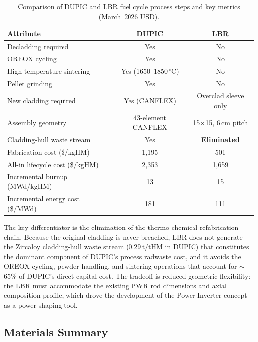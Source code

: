 \begin{table}[H]
\centering
\caption{Comparison of DUPIC and LBR fuel cycle process steps and key
metrics (March~2026 USD).}
\label{tab:dupic_lbr}
\renewcommand{\arraystretch}{1.30}
\begin{tabular}{l c c}
\toprule
\textbf{Attribute} & \textbf{DUPIC} & \textbf{LBR} \\
\midrule
Decladding required             & Yes               & No \\
OREOX cycling                   & Yes               & No \\
High-temperature sintering      & Yes (1650--1850\,$^\circ$C) & No \\
Pellet grinding                 & Yes               & No \\
New cladding required           & Yes (CANFLEX)     & Overclad sleeve only \\
Assembly geometry               & 43-element CANFLEX & 15$\times$15, 6\,cm pitch \\
Cladding-hull waste stream      & Yes               & \textbf{Eliminated} \\
Fabrication cost (\$/kgHM)      & 1,195             & 501 \\
All-in lifecycle cost (\$/kgHM) & 2,353             & 1,659 \\
Incremental burnup (MWd/kgHM)   & 13                & 15 \\
Incremental energy cost (\$/MWd)& 181               & 111 \\
\bottomrule
\end{tabular}
\end{table}

The key differentiator is the elimination of the thermo-chemical refabrication
chain. Because the original cladding is never breached, LBR does not generate
the Zircaloy cladding-hull waste stream (0.29\,t/tHM in DUPIC) that
constitutes the dominant component of DUPIC's process radwaste cost, and it
avoids the OREOX cycling, powder handling, and sintering operations that
account for $\sim$65\% of DUPIC's direct capital cost. The tradeoff is
reduced geometric flexibility: the LBR must accommodate the existing PWR rod
dimensions and axial composition profile, which drove the development of the
Power Inverter concept as a power-shaping tool.

\subsection{Materials Summary}


